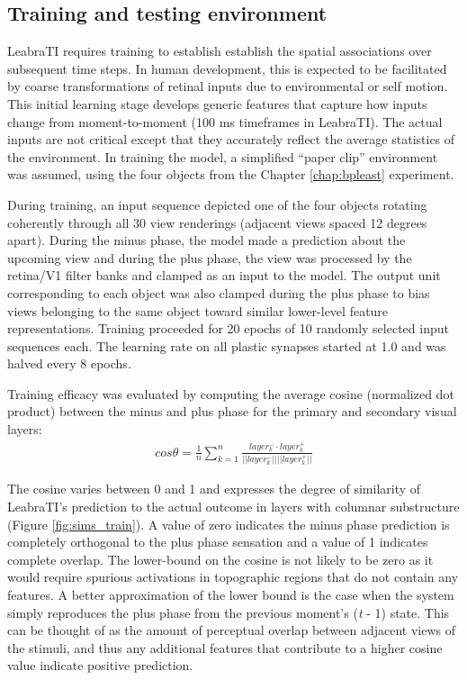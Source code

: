 \documentclass[dwyatte_dissertation.tex]{subfiles}
\begin{document}
\subsection{Training and testing environment}
LeabraTI requires training to establish establish the spatial associations over subsequent time steps. In human development, this is expected to be facilitated by coarse transformations of retinal inputs due to environmental or self motion. This initial learning stage develops generic features that capture how inputs change from moment-to-moment (100 ms timeframes in LeabraTI). The actual inputs are not critical except that they accurately reflect the average statistics of the environment. In training the model, a simplified  ``paper clip'' environment was assumed, using the four objects from the Chapter \ref{chap:bpleast} experiment.

During training, an input sequence depicted one of the four objects rotating coherently through all 30 view renderings (adjacent views spaced 12 degrees apart). During the minus phase, the model made a prediction about the upcoming view and during the plus phase, the view was processed by the retina/V1 filter banks and clamped as an input to the model. The output unit corresponding to each object was also clamped during the plus phase to bias views belonging to the same object toward similar lower-level feature representations. Training proceeded for 20 epochs of 10 randomly selected input sequences each. The learning rate on all plastic synapses started at 1.0 and was halved every 8 epochs.

Training efficacy was evaluated by computing the average cosine (normalized dot product) between the minus and plus phase for the primary and secondary visual layers:
\begin{align*}
cos \theta = \frac{1}{n}\sum_{k=1}^{n}\frac{layer_k^- \cdot{} layer_k^+}{||layer_k^-||||layer_k^+||}
\end{align*}

The cosine varies between 0 and 1 and expresses the degree of similarity of LeabraTI's prediction to the actual outcome in layers with columnar substructure (Figure \ref{fig:sims_train}). A value of zero indicates the minus phase prediction is completely orthogonal to the plus phase sensation and a value of 1 indicates complete overlap. The lower-bound on the cosine is not likely to be zero as it would require spurious activations in topographic regions that do not contain any features. A better approximation of the lower bound is the case when the system simply reproduces the plus phase from the previous moment's (\textit{t} - 1) state. This can be thought of as the amount of perceptual overlap between adjacent views of the stimuli, and thus any additional features that contribute to a higher cosine value indicate positive prediction.
\end{document}
